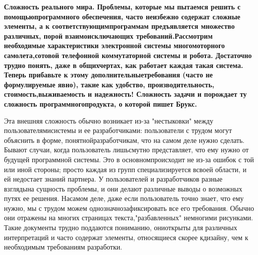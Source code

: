 \documentclass[11pt]{article}
\begin{document}
\bf Сложность реального мира. \rm Проблемы, которые мы пытаемся решить с помощью\linebreak программного обеспечения, часто неизбежно содержат сложные элементы, а к соответствующим\linebreak программам предъявляется множество различных, порой взаимоисключающих требований.\linebreak Рассмотрим необходимые характеристики электронной системы многомоторного самолета,\linebreak сотовой телефонной коммутаторной системы и робота. Достаточно трудно понять, даже в общих\linebreak чертах, как работает каждая такая система. Теперь прибавьте к этому дополнительные\linebreak требования (часто не формулируемые явно), такие как удобство, производительность, стоимость,\linebreak выживаемость и надежность! Сложность задачи и порождает ту сложность программного\linebreak продукта, о которой пишет Брукс. \bigskip

Эта внешняя сложность обычно возникает из-за "нестыковки" между пользователями\linebreak системы и ее разработчиками: пользователи с трудом могут объяснить в форме, понятной\linebreak разработчикам, что на самом деле нужно сделать. Бывают случаи, когда пользователь лишь\linebreak смутно представляет, что ему нужно от будущей программной системы. Это в основном\linebreak происходит не из-за ошибок с той или иной стороны; просто каждая из групп специализируется в\linebreak своей области, и ей недостает знаний партнера. У пользователей и разработчиков разные взгляды\linebreak на сущность проблемы, и они делают различные выводы о возможных путях ее решения. На\linebreak самом деле, даже если пользователь точно знает, что ему нужно, мы с трудом можем однозначно\linebreak зафиксировать все его требования. Обычно они отражены на многих страницах текста,\linebreak "разбавленных" немногими рисунками. Такие документы трудно поддаются пониманию, они\linebreak открыты для различных интерпретаций и часто содержат элементы, относящиеся скорее к\linebreak дизайну, чем к необходимым требованиям разработки. \bigskip
\end{document}
